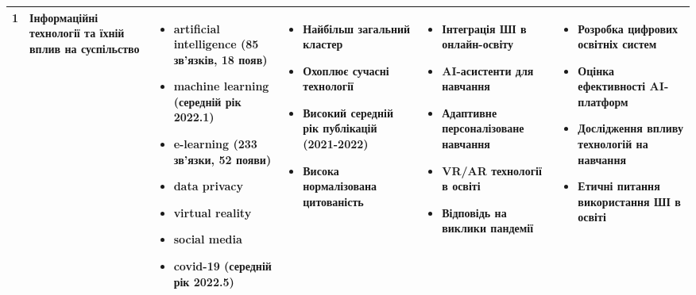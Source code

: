 \documentclass[12pt,a4paper,landscape]{article}
\begin{document}
\begin{longtable}{|p{1cm}|p{3.5cm}|p{5cm}|p{4cm}|p{4cm}|p{5cm}|}
\cellcolor{red!20}1 & 
\textbf{Інформаційні технології та їхній вплив на суспільство} & 
\begin{itemize}
    \item artificial intelligence (85 зв'язків, 18 появ)
    \item machine learning (середній рік 2022.1)
    \item e-learning (233 зв'язки, 52 появи)
    \item data privacy
    \item virtual reality
    \item social media
    \item covid-19 (середній рік 2022.5)
\end{itemize} & 
\begin{itemize}
    \item Найбільш загальний кластер
    \item Охоплює сучасні технології
    \item Високий середній рік публікацій (2021-2022)
    \item Висока нормалізована цитованість
\end{itemize} & 
\begin{itemize}
    \item Інтеграція ШІ в онлайн-освіту
    \item AI-асистенти для навчання
    \item Адаптивне персоналізоване навчання
    \item VR/AR технології в освіті
    \item Відповідь на виклики пандемії
\end{itemize} & 
\begin{itemize}
    \item Розробка цифрових освітніх систем
    \item Оцінка ефективності AI-платформ
    \item Дослідження впливу технологій на навчання
    \item Етичні питання використання ШІ в освіті
\end{itemize} \\
\hline


\end{longtable}
\end{document}
